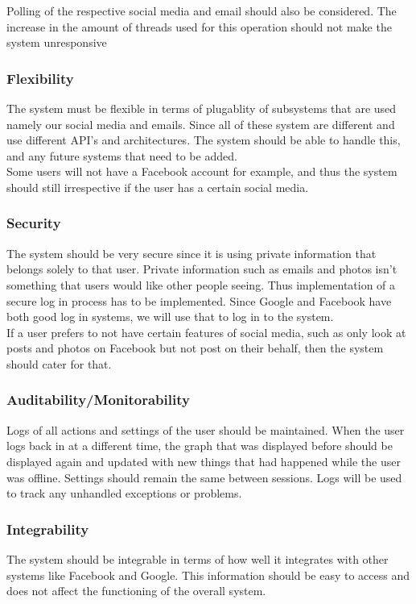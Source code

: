 \documentclass[hidelinks,english]{article}
\begin{document}
                Polling of the respective social media and email should also be considered. The increase in the amount of threads used for this operation should not make the system unresponsive
            \subsubsection{Flexibility}
                The system must be flexible in terms of plugablity of subsystems that are used namely our social media and emails. Since all of these system are different and use different API's and architectures. The system should be able to handle this, and any future systems that need to be added.\\
                Some users will not have a Facebook account for example, and thus the system should still irrespective if the user has a certain social media.

            \subsubsection{Security}
                The system should be very secure since it is using private information that belongs solely to that user. Private information such as emails and photos isn't something that users would like other people seeing. Thus implementation of a secure log in process has to be implemented. Since Google and Facebook have both good log in systems, we will use that to log in to the system.\\
                If a user prefers to not have certain features of social media, such as only look at posts and photos on Facebook but not post on their behalf, then the system should cater for that.
            \subsubsection{Auditability/Monitorability}
                Logs of all actions and settings of the user should be maintained. When the user logs back in at a different time, the graph that was displayed before should be displayed again and updated with new things that had happened while the user was offline. Settings should remain the same between sessions. Logs will be used to track any unhandled exceptions or problems.
            \subsubsection{Integrability}
                The system should be integrable in terms of how well it integrates with other systems like Facebook and Google. This information should be easy to access and does not affect the functioning of the overall system.
\end{document}
